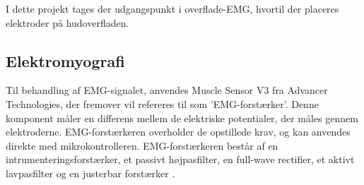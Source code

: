 


I dette projekt tages der udgangspunkt i overflade-EMG, hvortil der placeres elektroder på hudoverfladen. 

\subsection{Elektromyografi}
Til behandling af EMG-signalet, anvendes Muscle Sensor V3 fra Advancer Technologies, der fremover vil refereres til som 'EMG-forstærker'. Denne komponent måler en differens mellem de elektriske potentialer, der måles gennem elektroderne. EMG-forstærkeren overholder de opstillede krav, og kan anvendes direkte med mikrokontrolleren. EMG-forstærkeren består af en intrumenteringsforstærker, et passivt højpasfilter, en full-wave rectifier, et aktivt lavpasfilter og en justerbar forstærker \citep{advancertech2013}. 

